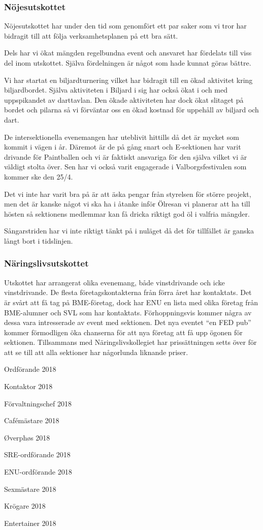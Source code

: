 \documentclass[../_main/handlingar.tex]{subfiles}
\begin{document}
\subsubsection*{Nöjesutskottet}
Nöjesutskottet har under den tid som genomfört ett par saker som vi tror har bidragit till att följa verksamhetsplanen på ett bra sätt.
\begin{dashlist}
    \item Dels har vi ökat mängden regelbundna event och ansvaret har fördelats till viss del inom utskottet. Själva fördelningen är något som hade kunnat göras bättre.
    \item Vi har startat en biljardturnering vilket har bidragit till en ökad aktivitet kring biljardbordet. Själva aktiviteten i Biljard i sig har också ökat i och med uppspikandet av darttavlan. Den ökade aktiviteten har dock ökat slitaget på bordet och pilarna så vi förväntar oss en ökad kostnad för uppehåll av biljard och dart.
    \item De intersektionella evenemangen har uteblivit hittills då det är mycket som kommit i vägen i år. Däremot är de på gång snart och E-sektionen har varit drivande för Paintballen och vi är faktiskt ansvariga för den själva vilket vi är väldigt stolta över. Sen har vi också varit engagerade i Valborgsfestivalen som kommer ske den 25/4. 
\end{dashlist}

Det vi inte har varit bra på är att äska pengar från styrelsen för större projekt, men det är kanske något vi ska ha i åtanke inför Ölresan vi planerar att ha till hösten så sektionens medlemmar kan få dricka riktigt god öl i valfria mängder. 

Sångarstriden har vi inte riktigt tänkt på i nuläget då det för tillfället är ganska långt bort i tidslinjen. 

\subsubsection*{Näringslivsutskottet}
Utskottet har arrangerat olika evenemang, både vinstdrivande och icke vinstdrivande. De flesta företagskontakterna från förra året har kontaktats. Det är svårt att få tag på BME-företag, dock har ENU en lista med olika företag från BME-alumner och SVL som har kontaktats. Förhoppningsvis kommer några av dessa vara intresserade av event med sektionen. Det nya eventet “en FED pub” kommer förmodligen öka chanserna för att nya företag att få upp ögonen för sektionen.
Tillsammans med Näringslivskollegiet har prissättningen setts över för att se till att alla sektioner har någorlunda liknande priser.

\newpage
\begin{signatures}{10}
    \mvh
    \signature{Daniel Bakic}{Ordförande 2018}
    \signature{Axel Voss}{Kontaktor 2018}
    \signature{Magnus Lundh}{Förvaltningschef 2018}
    \signature{Elin Johansson}{Cafémästare 2018}
    \signature{Andreas Bennström}{Øverphøs 2018}
    \signature{Fanny Månefjord}{SRE-ordförande 2018}
    \signature{Isabella Hansen}{ENU-ordförande 2018}
    \signature{Alexander Wik}{Sexmästare 2018}
    \signature{Malin Heyden}{Krögare 2018}
    \signature{Adam Belfrage}{Entertainer 2018}
\end{signatures}
\end{document}
